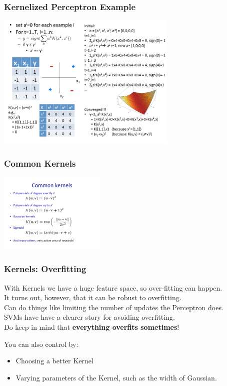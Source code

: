 \subsubsection{Kernelized Perceptron Example}

\includegraphics[width=3.4in]{figures/kernelized_perceptron_example.pdf}

\subsubsection{Common Kernels}

\includegraphics[width=2.0in]{figures/common_kernels.pdf}

\subsubsection{Kernels: Overfitting}

With Kernels we have a huge feature space, so over-fitting can happen. \hfill \\
It turns out, however, that it can be robust to overfitting. \hfill \\
Can do things like limiting the number of updates the Perceptron does. \hfill \\
SVMs have have a clearer story for avoiding overfitting.  \hfill \\

Do keep in mind that \textbf{everything overfits sometimes}!

You can also control by:
\begin{itemize}
	\item Choosing a better Kernel
	\item Varying parameters of the Kernel, such as the width of Gaussian.
\end{itemize}

